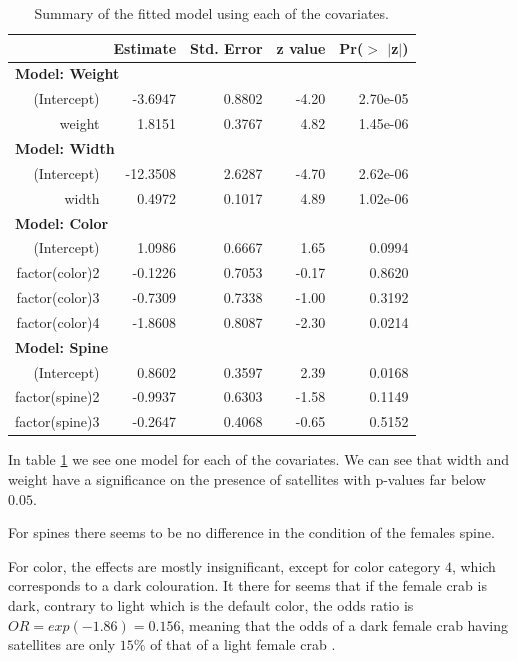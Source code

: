 \documentclass[a4paper,norsk, 10pt]{article}
\begin{document}
\begin{table}[!htb]
\centering
\begin{tabular}{rrrrr}
  \hline
 & Estimate & Std. Error & z value & Pr($>$ $|$z$|$) \\ 
  \hline
  \multicolumn{5}{l}{\textbf{Model: Weight}}\\
(Intercept) & -3.6947 & 0.8802 & -4.20 & 2.70e-05 \\ 
  weight & 1.8151 & 0.3767 & 4.82 & 1.45e-06 \\ 
   \hline
   \multicolumn{5}{l}{\textbf{Model: Width}}\\
   (Intercept) & -12.3508 & 2.6287 & -4.70 & 2.62e-06 \\ 
  width & 0.4972 & 0.1017 & 4.89 & 1.02e-06 \\ 
   \hline
   \multicolumn{5}{l}{\textbf{Model: Color}}\\
   (Intercept) & 1.0986 & 0.6667 & 1.65 & 0.0994 \\ 
  factor(color)2 & -0.1226 & 0.7053 & -0.17 & 0.8620 \\ 
  factor(color)3 & -0.7309 & 0.7338 & -1.00 & 0.3192 \\ 
  factor(color)4 & -1.8608 & 0.8087 & -2.30 & 0.0214 \\ 
   \hline
   \multicolumn{5}{l}{\textbf{Model: Spine}}\\
   (Intercept) & 0.8602 & 0.3597 & 2.39 & 0.0168 \\ 
  factor(spine)2 & -0.9937 & 0.6303 & -1.58 & 0.1149 \\ 
  factor(spine)3 & -0.2647 & 0.4068 & -0.65 & 0.5152 \\ 
   \hline
\end{tabular}
\caption{Summary of the fitted model using each of the covariates.}
\label{tab:crabs_each}
\end{table}

In table \ref{tab:crabs_each} we see one model for each of the covariates. We can see that width and weight have a significance on the presence of satellites with p-values far below $0.05$. 

For spines there seems to be no difference in the condition of the females spine. 

For color, the effects are mostly insignificant, except for color category $4$, which corresponds to a dark colouration. It there for seems that if the female crab is dark, contrary to light which is the default color, the odds ratio is $OR = exp(-1.86) = 0.156$, meaning that the odds of a dark female crab having satellites are only $15\%$ of that of a light female crab .
\end{document}
